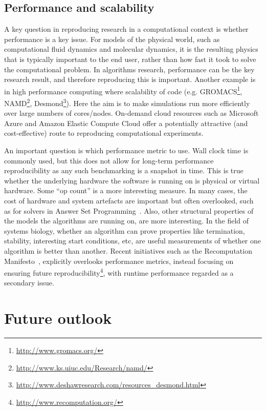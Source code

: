 \documentclass[conference]{IEEEtran}
\begin{document}
\subsection{Performance and scalability}

A key question in reproducing research in a computational context is
whether performance is a key issue. For models of the physical world,
such as computational fluid dynamics and molecular dynamics, it is the
resulting physics that is typically important to the end user, rather
than how fast it took to solve the computational problem. In
algorithms research, performance can be the key research result, and
therefore reproducing this is important. Another example is in high
performance computing where scalability of code
(e.g. GROMACS\footnote{\url{http://www.gromacs.org/}},
NAMD\footnote{\url{http://www.ks.uiuc.edu/Research/namd/}},
Desmond\footnote{\url{http://www.deshawresearch.com/resources_desmond.html}}). Here
the aim is to make simulations run more efficiently over large numbers
of cores/nodes. On-demand cloud resources such as Microsoft Azure and
Amazon Elastic Compute Cloud offer a potentially attractive (and
cost-effective) route to reproducing computational experiments.

An important question is which performance metric to use. Wall clock
time is commonly used, but this does not allow for long-term
performance reproducibility as any such benchmarking is a snapshot in
time. This is true whether the underlying hardware the software is
running on is physical or virtual hardware. Some ``op count'' is a
more interesting measure. In many cases, the cost of hardware and
system artefacts are important but often overlooked, such as for
solvers in Answer Set Programming~\cite{brain+devos:2009}. Also, other
structural properties of the models the algorithms are running on, are
more interesting. In the field of systems biology, whether an
algorithm can prove properties like termination, stability,
interesting start conditions, etc, are useful measurements of whether
one algorithm is better than another. Recent initiatives such as the
Recomputation Manifesto~\cite{gent:2013}, explicitly overlooks
performance metrics, instead focusing on ensuring future
reproducibility\footnote{\url{http://www.recomputation.org/}}, with
runtime performance regarded as a secondary issue.

\section{Future outlook}
\end{document}
